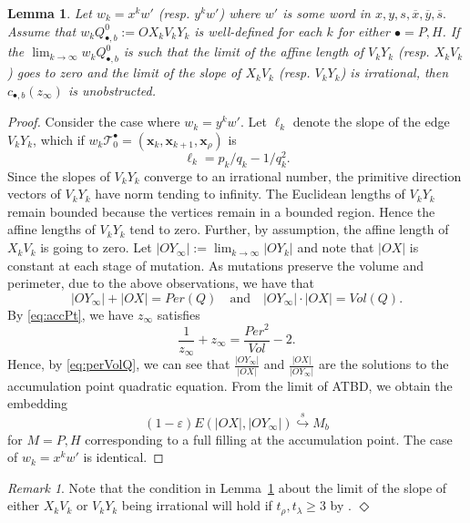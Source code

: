 \documentclass[11pt, reqno]{amsart}
\newtheorem{lemma}[thm]{Lemma}
\theoremstyle{remark}
\numberwithin{equation}{subsection}
\numberwithin{figure}{section}
\theoremstyle{customremark}
\newtheorem{rmk_no_diamond}[thm]{Remark}
\newenvironment{rmk}{\begin{rmk_no_diamond} } {\hfill$\er$ \end{rmk_no_diamond}}
\newcommand{\Tt}{\mathcal{T}}
\newcommand{\ov}{\overline}
\newcommand{\la}{{\lambda}}
\newcommand{\er}{{\Diamond}}
\newcommand{\eps}{\varepsilon}
\newcommand{\sembeds}{\stackrel{s}{\hookrightarrow}}
\begin{document}
\begin{lemma} \label{lem:fullFillingAccPt}
   Let $w_k=x^kw'$ (resp. $y^kw'$) where $w'$ is some word in $x,y,s,\ov{x},\ov{y},\ov{s}.$  Assume that $w_kQ_{\bullet,b}^{0}:=OX_kV_kY_k$ is well-defined for each $k$ for either $\bullet=P,H$. If the $\lim_{k \to \infty} w_kQ_{\bullet,b}^{0}$ is such that the limit of the affine length of $V_kY_k$ (resp. $X_kV_k$) goes to zero and 
   the limit of the slope of $X_kV_k$ (resp. $V_kY_k$) is irrational, then $c_{\bullet,b}(z_\infty)$ is unobstructed. 
\end{lemma}
\begin{proof}
    Consider the case where $w_k=y^kw'.$ Let $\ell_k$ denote the slope of the edge $V_kY_k$, which if $w_k\Tt_0^\bullet=(\bm{x}_{k},\bm{x}_{k+1},\bm{x}_{\rho})$ is 
    \[\ell_k=p_{k}/q_{k}-1/q_{k}^2.\] 
    Since the slopes of \(V_kY_k\) converge to an irrational number, the
primitive direction vectors of \(V_kY_k\) have norm tending to infinity.
The Euclidean lengths of \(V_kY_k\) remain bounded because the vertices
remain in a bounded region. Hence the affine lengths of \(V_kY_k\) tend to
zero.
 Further, by assumption, the affine length of $X_kV_k$ is going to zero. Let $|OY_\infty|:=\lim_{k \to \infty} |OY_k|$ and note that $|OX|$ is constant at each stage of mutation. As mutations preserve the volume and perimeter, due to the above observations, we have that
    \begin{equation} \label{eq:perVolQ}
         |OY_\infty|+|OX|=Per(Q) \quad \text{and} \quad |OY_\infty|\cdot |OX|=Vol(Q).
    \end{equation}
    By \eqref{eq:accPt}, we have $z_\infty$ satisfies
    \[ \frac{1}{z_\infty}+z_\infty=\frac{Per^2}{Vol}-2.\]
    Hence, by \eqref{eq:perVolQ}, we can see that $\frac{|OY_\infty|}{|OX|}$ and $\frac{|OX|}{|OY_\infty|}$ are the solutions to the accumulation point quadratic equation. From the limit of ATBD, we obtain the embedding 
    \[ (1-\eps)E(|OX|,|OY_\infty|) \sembeds M_b\] for $M=P,H$ corresponding to a full filling at the accumulation point. 
    The case of $w_k=x^kw'$ is identical. 
\end{proof}

\begin{rmk} \rm 
 
    Note that the condition in Lemma~\ref{lem:fullFillingAccPt} about the limit of the slope of either $X_kV_k$ or $V_kY_k$ being irrational will hold if $t_\rho,t_\la \geq 3$ by \cite[Remark 2.1.3]{MM}. 
\end{rmk}
\end{document}
